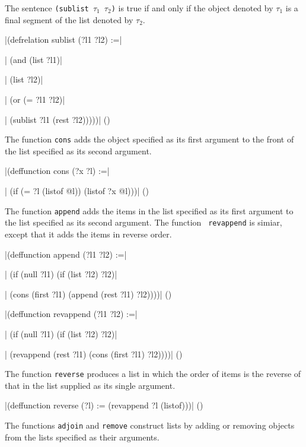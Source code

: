 The sentence {\tt (sublist $\tau_1$ $\tau_2$)} is true if and only if
the object denoted by $\tau_1$ is a final segment of the list denoted by
$\tau_2$.

\medskip
\verbatim|(defrelation sublist (?l1 ?l2) :=|\par
\verbatim|  (and (list ?l1)|\par
\verbatim|       (list ?l2)|\par
\verbatim|       (or (= ?l1 ?l2)|\par
\verbatim|           (sublist ?l1 (rest ?l2)))))|
\hfill(\equation)\par
\medskip

The function {\tt cons} adds the object specified as its first
argument to the front of the list specified as its second argument.

\medskip
\verbatim|(deffunction cons (?x ?l) :=|\par
\verbatim|  (if (= ?l (listof @l)) (listof ?x @l)))|
\hfill(\equation)\par \medskip

The function {\tt append} adds the items in the list specified as its first
argument to the list specified as its second argument.  The function {\tt
revappend} is simiar, except that it adds the items in reverse order.

\medskip
\verbatim|(deffunction append (?l1 ?l2) :=|\par
\verbatim|  (if (null ?l1) (if (list ?l2) ?l2)|\par
\verbatim|      (cons (first ?l1) (append (rest ?l1) ?l2))))|
\hfill(\equation)\par
\medskip

\medskip
\verbatim|(deffunction revappend (?l1 ?l2) :=|\par
\verbatim|  (if (null ?l1) (if (list ?l2) ?l2)|\par
\verbatim|      (revappend (rest ?l1) (cons (first ?l1) ?l2))))| 
\hfill(\equation)\par
\medskip

The function {\tt reverse} produces a list in which the order of items is the
reverse of that in the list supplied as its single argument.

\medskip
\verbatim|(deffunction reverse (?l) := (revappend ?l (listof)))| 
\hfill(\equation)\par
\medskip

The functions {\tt adjoin} and {\tt remove} construct lists by adding or
removing objects from the lists specified as their arguments.

